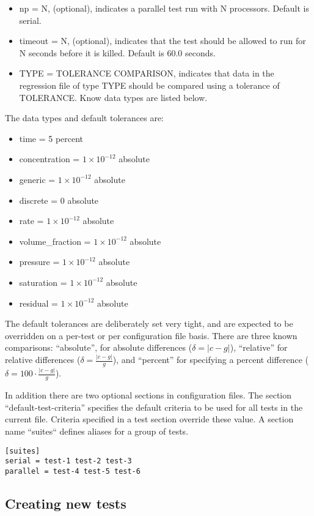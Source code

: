 \begin{itemize}
\item np = N, (optional), indicates a parallel test run with N processors. Default is serial.
\item timeout = N, (optional), indicates that the test should be allowed to run
  for N seconds before it is killed. Default is 60.0 seconds.
\item TYPE = TOLERANCE COMPARISON, indicates that data in the
  regression file of type TYPE should be compared using a tolerance of
  TOLERANCE. Know data types are listed below.
\end{itemize}

The data types and default tolerances are:
\begin{itemize}
\item time = 5 percent
\item concentration = $1\times 10^{-12}$ absolute
\item generic = $1\times 10^{-12}$ absolute
\item discrete = 0 absolute
\item rate = $1\times 10^{-12}$ absolute
\item volume\_fraction = $1\times 10^{-12}$ absolute
\item pressure = $1\times 10^{-12}$ absolute
\item saturation = $1\times 10^{-12}$ absolute
\item residual = $1\times 10^{-12}$ absolute
\end{itemize}
The default tolerances are deliberately set very tight, and are
expected to be overridden on a per-test or per configuration file
basis.  There are three known comparisons: ``absolute'', for absolute
differences ($\delta=|c-g|$), ``relative'' for relative differences ($\delta=\frac{|c-g|}{g}$), and ``percent''
for specifying a percent difference ($\delta=100\cdot\frac{|c-g|}{g}$).

In addition there are two optional sections in configuration
files. The section ``default-test-criteria'' specifies the default
criteria to be used for all tests in the current file. Criteria
specified in a test section override these value. A section name
``suites`` defines aliases for a group of tests.
\begin{verbatim}
[suites]
serial = test-1 test-2 test-3
parallel = test-4 test-5 test-6
\end{verbatim}

\subsection{Creating new tests}

